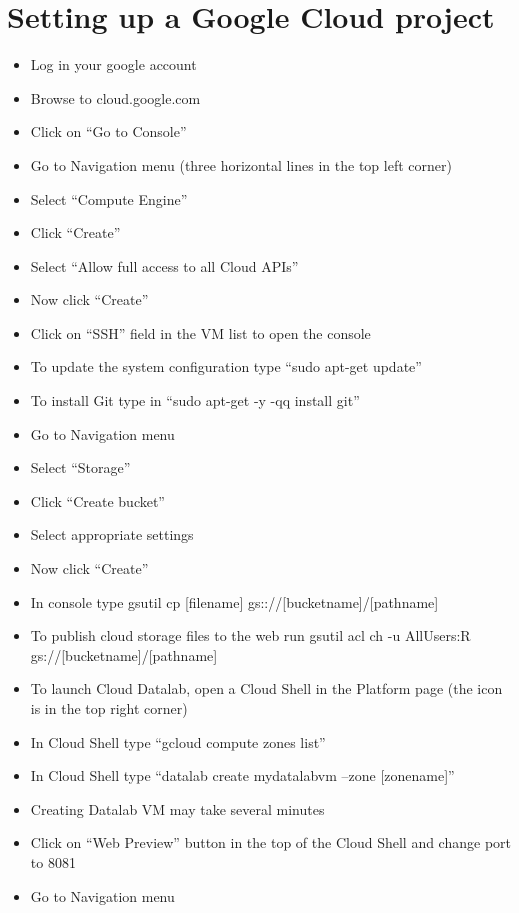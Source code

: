 \documentclass[12pt]{article}
\begin{document}
\section{Setting up a Google Cloud project}
\begin{itemize}
  \item Log in your google account
  \item Browse to cloud.google.com
  \item Click on ``Go to Console''
  \item Go to Navigation menu (three horizontal lines in the top left corner)
  \item Select ``Compute Engine''
  \item Click ``Create''
  \item Select ``Allow full access to all Cloud APIs''
  \item Now click ``Create''
  \item Click on ``SSH'' field in the VM list to open the console
  \item To update the system configuration type ``sudo apt-get update''
  \item To install Git type in ``sudo apt-get -y -qq install git''
  \item Go to Navigation menu
  \item Select ``Storage''
  \item Click ``Create bucket''
  \item Select appropriate settings
  \item Now click ``Create''
  \item In console type gsutil cp [filename] gs:://[bucketname]/[pathname]
  \item To publish cloud storage files to the web run gsutil acl ch -u AllUsers:R gs://[bucketname]/[pathname]
  \item To launch Cloud Datalab, open a Cloud Shell in the Platform page (the icon is in the top right corner)
  \item In Cloud Shell type ``gcloud compute zones list''
  \item In Cloud Shell type ``datalab create mydatalabvm --zone [zonename]''
  \item Creating Datalab VM may take several minutes
  \item Click on ``Web Preview'' button in the top of the Cloud Shell and change port to 8081
  \item Go to Navigation menu

\end{itemize}
\end{document}
